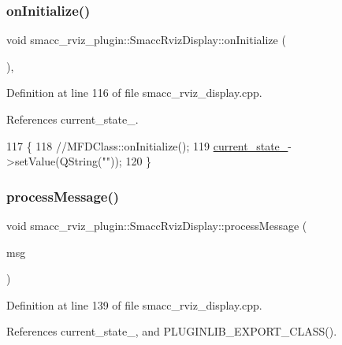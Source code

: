 \subsubsection{\texorpdfstring{on\+Initialize()}{onInitialize()}}
{\footnotesize\ttfamily void smacc\+\_\+rviz\+\_\+plugin\+::\+Smacc\+Rviz\+Display\+::on\+Initialize (\begin{DoxyParamCaption}{ }\end{DoxyParamCaption})\hspace{0.3cm}{\ttfamily [protected]}, {\ttfamily [virtual]}}



Definition at line 116 of file smacc\+\_\+rviz\+\_\+display.\+cpp.



References current\+\_\+state\+\_\+.


\begin{DoxyCode}
117 \{
118   \textcolor{comment}{//MFDClass::onInitialize();}
119   \hyperlink{classsmacc__rviz__plugin_1_1SmaccRvizDisplay_a342ff238c1dfaa427f09ee205a9e92d5}{current\_state\_}->setValue(QString(\textcolor{stringliteral}{""}));
120 \}
\end{DoxyCode}
\mbox{\label{classsmacc__rviz__plugin_1_1SmaccRvizDisplay_acc7281b99c92fa89f7494f6ca53e4905}} 
\subsubsection{\texorpdfstring{process\+Message()}{processMessage()}}
{\footnotesize\ttfamily void smacc\+\_\+rviz\+\_\+plugin\+::\+Smacc\+Rviz\+Display\+::process\+Message (\begin{DoxyParamCaption}\item[{const smacc\+\_\+msgs\+::\+Smacc\+Status\+::\+Const\+Ptr \&}]{msg }\end{DoxyParamCaption})\hspace{0.3cm}{\ttfamily [private]}}



Definition at line 139 of file smacc\+\_\+rviz\+\_\+display.\+cpp.



References current\+\_\+state\+\_\+, and P\+L\+U\+G\+I\+N\+L\+I\+B\+\_\+\+E\+X\+P\+O\+R\+T\+\_\+\+C\+L\+A\+S\+S().



